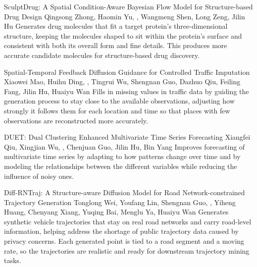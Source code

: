 {SculptDrug: A Spatial Condition-Aware Bayesian Flow Model for Structure-based Drug Design}
{Qingsong Zhong, Haomin Yu, \me, Wangmeng Shen, Long Zeng, Jilin Hu}
{Generates drug molecules that fit a target protein's three-dimensional structure, keeping the molecules shaped to sit within the protein's surface and consistent with both its overall form and fine details. This produces more accurate candidate molecules for structure-based drug discovery.}

{Spatial-Temporal Feedback Diffusion Guidance for Controlled Traffic Imputation}
{Xiaowei Mao, Huihu Ding, \me, Tingrui Wu, Shengnan Guo, Dazhuo Qiu, Feiling Fang, Jilin Hu, Huaiyu Wan}
{Fills in missing values in traffic data by guiding the generation process to stay close to the available observations, adjusting how strongly it follows them for each location and time so that places with few observations are reconstructed more accurately.}

{DUET: Dual Clustering Enhanced Multivariate Time Series Forecasting}
{Xiangfei Qiu, Xingjian Wu, \me, Chenjuan Guo, Jilin Hu, Bin Yang}
{Improves forecasting of multivariate time series by adapting to how patterns change over time and by modeling the relationships between the different variables while reducing the influence of noisy ones.}

{Diff-RNTraj: A Structure-aware Diffusion Model for Road Network-constrained Trajectory Generation}
{Tonglong Wei, Youfang Lin, Shengnan Guo, \me, Yiheng Huang, Chenyang Xiang, Yuqing Bai, Menglu Ya, Huaiyu Wan}
{Generates synthetic vehicle trajectories that stay on real road networks and carry road-level information, helping address the shortage of public trajectory data caused by privacy concerns. Each generated point is tied to a road segment and a moving rate, so the trajectories are realistic and ready for downstream trajectory mining tasks.}

